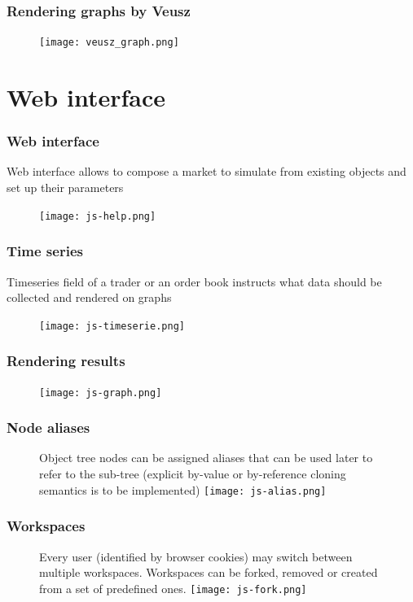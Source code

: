 \documentclass{beamer}
\begin{document}
\begin{frame}
\frametitle{Rendering graphs by Veusz}
\begin{figure}[htbp]
\centering
\texttt{[image: veusz\_graph.png]}
\end{figure}
\end{frame}


\section{Web interface}
\begin{frame}
\frametitle{Web interface}
Web interface allows to compose a market to simulate from existing objects and set up their parameters
\begin{figure}[htbp]
\centering
\texttt{[image: js-help.png]}
\end{figure}
\end{frame}

\begin{frame}
\frametitle{Time series}
Timeseries field of a trader or an order book instructs what data should be collected and rendered on graphs
\begin{figure}[htbp]
\centering
\texttt{[image: js-timeserie.png]}
\end{figure}
\end{frame}

\begin{frame}
\frametitle{Rendering results}
\begin{figure}[htbp]
\centering
\texttt{[image: js-graph.png]}
\end{figure}
\end{frame}

\begin{frame}
\frametitle{Node aliases}
\begin{figure}[htbp]
Object tree nodes can be assigned aliases that can be used later to refer to the sub-tree (explicit by-value or by-reference cloning semantics is to be implemented)
\centering
\texttt{[image: js-alias.png]}
\end{figure}
\end{frame}

\begin{frame}
\frametitle{Workspaces}
\begin{figure}[htbp]
Every user (identified by browser cookies) may switch between multiple workspaces. Workspaces can be forked, removed or created from a set of predefined ones.
\centering
\texttt{[image: js-fork.png]}
\end{figure}
\end{frame}
\end{document}
